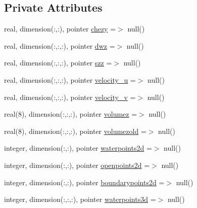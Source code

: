 \subsection*{Private Attributes}
\begin{DoxyCompactItemize}
\item 
real, dimension(\+:,\+:), pointer \mbox{\hyperlink{structmoduleinterfacesedimentwater_1_1t__ext__water_aac5c53931a679580b7a7943a2ffbb499}{chezy}} =$>$ null()
\item 
real, dimension(\+:,\+:,\+:), pointer \mbox{\hyperlink{structmoduleinterfacesedimentwater_1_1t__ext__water_a0087cd8eaca1204f0ab93d8ecde45c0c}{dwz}} =$>$ null()
\item 
real, dimension(\+:,\+:,\+:), pointer \mbox{\hyperlink{structmoduleinterfacesedimentwater_1_1t__ext__water_a074d6d598f29169c7f97b17af9023880}{szz}} =$>$ null()
\item 
real, dimension(\+:,\+:,\+:), pointer \mbox{\hyperlink{structmoduleinterfacesedimentwater_1_1t__ext__water_a0120bc01ab86bcccd3bcea413497db5b}{velocity\+\_\+u}} =$>$ null()
\item 
real, dimension(\+:,\+:,\+:), pointer \mbox{\hyperlink{structmoduleinterfacesedimentwater_1_1t__ext__water_abcb135c50010a4a8e3dc8eaf4599c067}{velocity\+\_\+v}} =$>$ null()
\item 
real(8), dimension(\+:,\+:,\+:), pointer \mbox{\hyperlink{structmoduleinterfacesedimentwater_1_1t__ext__water_abadc98c1d9c63f381b1d06fed157a702}{volumez}} =$>$ null()
\item 
real(8), dimension(\+:,\+:,\+:), pointer \mbox{\hyperlink{structmoduleinterfacesedimentwater_1_1t__ext__water_addbdd6ad6d0d2cdd383f823151af4f8b}{volumezold}} =$>$ null()
\item 
integer, dimension(\+:,\+:), pointer \mbox{\hyperlink{structmoduleinterfacesedimentwater_1_1t__ext__water_ab4fb6214232bc6db981f40aebe3fa57b}{waterpoints2d}} =$>$ null()
\item 
integer, dimension(\+:,\+:), pointer \mbox{\hyperlink{structmoduleinterfacesedimentwater_1_1t__ext__water_a7bcfdef089536e7662152f0e1b535228}{openpoints2d}} =$>$ null()
\item 
integer, dimension(\+:,\+:), pointer \mbox{\hyperlink{structmoduleinterfacesedimentwater_1_1t__ext__water_aa0f1b9cd8f28615ebef77254093fb4fb}{boundarypoints2d}} =$>$ null()
\item 
integer, dimension(\+:,\+:,\+:), pointer \mbox{\hyperlink{structmoduleinterfacesedimentwater_1_1t__ext__water_a0a65dad4502289ca5555af79b1afd2a7}{waterpoints3d}} =$>$ null()

\end{DoxyCompactItemize}
